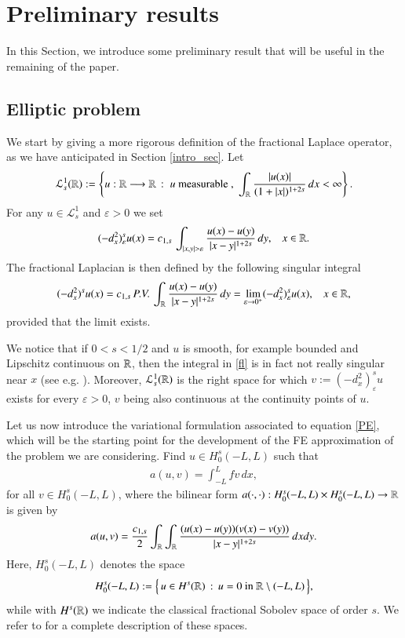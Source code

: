 \section{Preliminary results}\label{theor_sec}

In this Section, we introduce some preliminary result that will be useful in the remaining of the paper.

\subsection{Elliptic problem}

We start by giving a more rigorous definition of the fractional Laplace operator, as we have anticipated in Section \ref{intro_sec}. Let
\begin{align*}
	\mathcal L^1_s(\mathbb{R}) :=\left\{ u:\mathbb{R}\longrightarrow\mathbb{R}\,:\; u\textrm{ measurable },\;\int_{\mathbb{R}}\frac{|u(x)|}{(1+|x|)^{1+2s}}\,dx<\infty\right\}.
\end{align*}
For any $u\in\mathcal L_s^1$ and $\varepsilon>0$ we set 
\begin{align*}
	(-d_x^2)^s_{\varepsilon} u(x) = \ccs\,\int_{|x,y|>\varepsilon}\frac{u(x)-u(y)}{|x-y|^{1+2s}}\,dy,\;\;\; x\in\RR.
\end{align*}
The fractional Laplacian is then defined by the following singular integral
\begin{align}\label{fl}
	(-d_x^2)^{s}u(x) = c_{1,s}\,P.V.\,\int_{\mathbb{R}}\frac{u(x)-u(y)}{|x-y|^{1+2s}}\,dy = \lim_{\varepsilon\to 0^+} (-d_x^2)^s_{\varepsilon} u(x), \;\;\; x\in\mathbb{R},
\end{align}
provided that the limit exists. 

We notice that if $0<s<1/2$ and $u$ is smooth, for example bounded and Lipschitz continuous on $\mathbb{R}$, then the integral in \eqref{fl} is in fact not really singular near $x$ (see e.g. \cite[Remark 3.1]{dihitchhiker}). Moreover, $\mathcal L_s^1(\mathbb{R})$ is the right space for which $v:= (-d_x^2)^s_{\varepsilon} u$ exists for every $\varepsilon > 0$, $v$ being also continuous at the continuity points of $u$.

Let us now introduce the variational formulation associated to equation \eqref{PE}, which will be the starting point for the development of the FE approximation of the problem we are considering. Find $u\in H^s_0(-L,L)$ such that
\begin{align}\label{WF}
	a(u,v) = \int_{-L}^L fv\,dx,	
\end{align}
for all $v\in H_0^s(-L,L)$, where the bilinear form $a(\cdot,\cdot):H^s_0(-L,L)\times H^s_0(-L,L)\to \mathbb{R}$ is given by
\begin{align}\label{WF_bilinear}
	a(u,v)=\frac{c_{1,s}}{2} \int_{\mathbb{R}}\int_{\mathbb{R}}\frac{(u(x)-u(y))(v(x)-v(y))}{|x-y|^{1+2s}}\,dxdy.	
\end{align}
Here, $H^s_0(-L,L)$ denotes the space 
\begin{align*}
	H^s_0(-L,L) :=\Big\{\, u\in H^s(\mathbb{R})\,:\,u=0 \textrm{ in } \mathbb{R}\setminus(-L,L)\,\Big\}, 
\end{align*}
while with $H^s(\mathbb{R})$ we indicate the classical fractional Sobolev space of order $s$. We refer to \cite{dihitchhiker} for a complete description of these spaces.  

